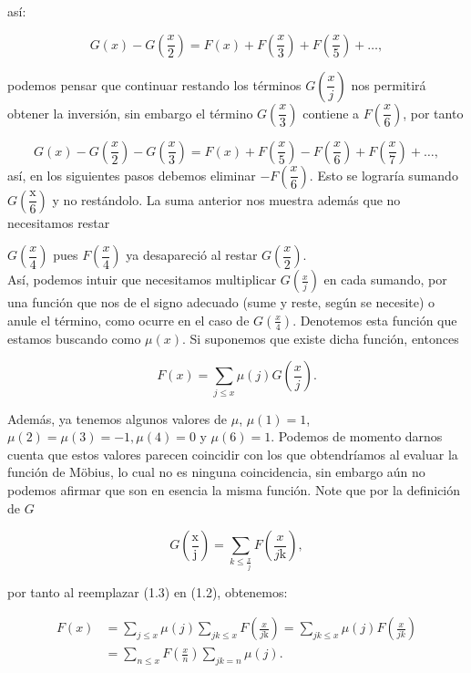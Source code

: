 así:

$$G(x)-G \left( \frac{x}{2} \right)=F(x)+F \left( \dfrac{x}{3} \right)+F \left( \dfrac{x}{5} \right)+\ldots,$$

podemos pensar que continuar restando los términos $G \left( \dfrac{x}{j} \right)$ nos permitirá obtener la inversión, sin embargo el término $G \left( \dfrac{x}{3} \right)$ contiene a $F \left( \dfrac{x}{6} \right)$, por tanto

$$
G(x)-G\left(\frac{x}{2}\right)-G\left(\frac{x}{3}\right)=F(x)+F\left(\frac{x}{5}\right)-F\left(\frac{x}{6}\right)+F\left(\frac{x}{7}\right)+\ldots,
$$
así, en los siguientes pasos debemos eliminar $-F\left(\dfrac{x}{6}\right)$. Esto se lograría sumando $G\left(\dfrac{\mathrm{x}}{6}\right)$ y no restándolo. La suma anterior nos muestra además que no necesitamos restar 

$G\left(\dfrac{x}{4}\right)$ pues $F\left(\dfrac{x}{4}\right)$ ya desapareció al restar $G\left(\dfrac{x}{2}\right)$.\\


Así, podemos intuir que necesitamos multiplicar $G(\frac{x}{j})$ en cada sumando, por una función que nos de el signo adecuado (sume y reste, según se necesite) o anule el término, como ocurre en el caso de $G\left(\frac{x}{4}\right)$. Denotemos esta función que estamos buscando como $\mu(x)$. Si suponemos que existe dicha función, entonces

\begin{equation}
F(x)=\sum_{j \leqslant x} \mu(j) G\left(\frac{x}{j}\right).
\end{equation}

Además, ya tenemos algunos valores de $\mu$, $\mu(1)=1$, $\mu(2)=\mu(3)=-1, \mu(4)=0$ y $\mu(6)=1$. Podemos de momento darnos cuenta que estos valores parecen coincidir con los que obtendríamos al evaluar la función de Möbius, lo cual no es ninguna coincidencia, sin embargo aún no podemos afirmar que son en esencia la misma función. Note que por la definición de $G$

\begin{equation}
G\left(\frac{\mathrm{x}}{\mathrm{j}}\right)=\sum_{k\leq \frac{x}{j}} F\left(\frac{x}{j \mathrm{k}}\right),
\end{equation}

por tanto al reemplazar (1.3) en (1.2), obtenemos:

\begin{align*}
    F(x)&=\sum_{j \leqslant x} \mu(j)\sum_{jk\leq x} F\left(\frac{x}{j \mathrm{k}}\right)=\sum_{jk\leq x}\mu(j)F \left( \frac{x}{jk} \right)\\
    &=\sum_{n\leq x}F \left( \frac{x}{n} \right)\sum_{jk=n}\mu(j)
.\end{align*}

